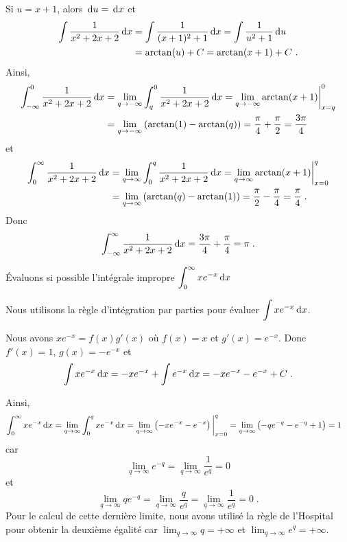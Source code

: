{\begin{egg}
Si $u=x+1$, alors $\,\mathrm{d}u = \,\mathrm{d}x$ et
\begin{align*}
\int \frac{1}{x^2+2x+2} \,\mathrm{d}x &= \int \frac{1}{(x+1)^2 + 1} \,\mathrm{d}x
= \int \frac{1}{u^2+1} \,\mathrm{d}u \\
&= \arctan(u) + C = \arctan(x+1) + C \ .
\end{align*}
Ainsi,
\begin{align*}
\int_{-\infty}^0 \frac{1}{x^2+2x+2} \,\mathrm{d}x
& = \lim_{q\rightarrow -\infty} \int_q^0 \frac{1}{x^2+2x+2} \,\mathrm{d}x
= \lim_{q\rightarrow -\infty} \arctan(x+1)\bigg|_{x=q}^0 \\
&= \lim_{q\rightarrow -\infty} \left(\arctan(1) - \arctan(q)\right)
= \frac{\pi}{4} + \frac{\pi}{2} = \frac{3\pi}{4}
\end{align*}
et
\begin{align*}
\int_0^{\infty} \frac{1}{x^2+2x+2} \,\mathrm{d}x
&= \lim_{q\rightarrow \infty} \int_0^q \frac{1}{x^2+2x+2} \,\mathrm{d}x
= \lim_{q\rightarrow \infty} \arctan(x+1)\bigg|_{x=0}^q \\
&= \lim_{q\rightarrow \infty} \left(\arctan(q) - \arctan(1)\right)
= \frac{\pi}{2} - \frac{\pi}{4} = \frac{\pi}{4} \; .
\end{align*}
Donc
\[
\int_{-\infty}^\infty \frac{1}{x^2+2x+2} \,\mathrm{d}x = \frac{3\pi}{4} +
\frac{\pi}{4} = \pi \; .
\]
\end{egg}
 
\begin{egg}
Évaluons si possible l'intégrale impropre
$\displaystyle \int_0^{\infty} x e^{-x} \,\mathrm{d}x$

Nous utilisons la règle d'intégration par parties pour évaluer
$\displaystyle \int x e^{-x} \,\mathrm{d}x$.

Nous avons $x e^{-x} = f(x) g'(x)$ où $f(x) = x$ et $g'(x) = e^{-x}$.
Donc $f'(x) = 1$, $g(x) = - e^{-x}$ et 
\[
\int x e^{-x} \,\mathrm{d}x
= -x e^{-x} + \int e^{-x} \,\mathrm{d}x = -x e^{-x} - e^{-x} + C \; .
\]

Ainsi,
\begin{align*}
\int_0^{\infty} x e^{-x} \,\mathrm{d}x &
= \lim_{q\rightarrow \infty} \int_0^q x e^{-x} \,\mathrm{d}x
= \lim_{q\rightarrow \infty} \left( -x e^{-x} - e^{-x} \right)\bigg|_{x=0}^q
= \lim_{q\rightarrow \infty} \left( -q e^{-q} - e^{-q} + 1\right) = 1
\end{align*}
car
\[
\lim_{q\rightarrow \infty} e^{-q} = \lim_{q\rightarrow \infty} \frac{1}{e^q} = 0
\]
et
\[
\lim_{q\rightarrow \infty} q e^{-q}
= \lim_{q\rightarrow \infty} \frac{q}{e^q} 
= \lim_{q\rightarrow \infty} \frac{1}{e^q} = 0 \; .
\]
Pour le calcul de cette dernière limite, nous avons utilisé la règle
de l'Hospital pour obtenir la deuxième égalité car
$\displaystyle \lim_{q\rightarrow \infty} q = +\infty$ et
$\displaystyle \lim_{q\rightarrow \infty} e^q = +\infty$.
\end{egg}

}
